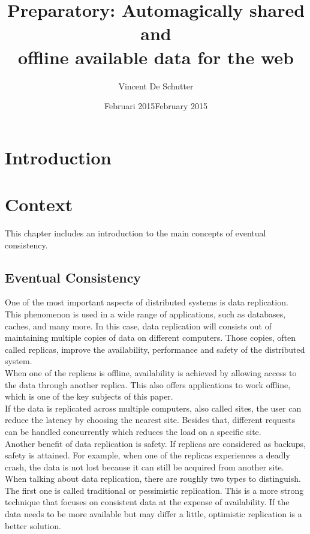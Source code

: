 \documentclass[a4paper,12pt]{report}
\author{Vincent De Schutter}
\title{Preparatory: Automagically shared and \\offline available data for the web}
\date{Februari 2015}
\begin{document}
\maketitlepage


\date{February 2015}

\maketitlepage

\tableofcontents
\newpage

\chapter{Introduction}\label{cha:Introduction} %
\chapter{Context}\label{cha:Context} %

This chapter includes an introduction to the main concepts of eventual consistency. 

\section{Eventual Consistency}\label{sec:EventualConsistency}

One of the most important aspects of distributed systems is data replication. This phenomenon is used in a wide range of applications, such as databases, caches, and many more. In this case, data replication will consists out of maintaining multiple copies of data on different computers. Those copies, often called replicas, improve the availability, performance and safety of the distributed system. \\
When one of the replicas is offline, availability is achieved by allowing access to the data through another replica. This also offers applications to work offline, which is one of the key subjects of this paper. \\
If the data is replicated across multiple computers, also called sites, the user can reduce the latency by choosing the nearest site. Besides that, different requests can be handled concurrently which reduces the load on a specific site. \\
Another benefit of data replication is safety. If replicas are considered as backups, safety is attained. For example, when one of the replicas experiences a deadly crash, the data is not lost because it can still be acquired from another site.\\
\newline
When talking about data replication, there are roughly two types to distinguish. The first one is called traditional or pessimistic replication. This is a more strong technique that focuses on consistent data at the expense of availability. If the data needs to be more available but may differ a little, optimistic replication is a better solution.
\end{document}
